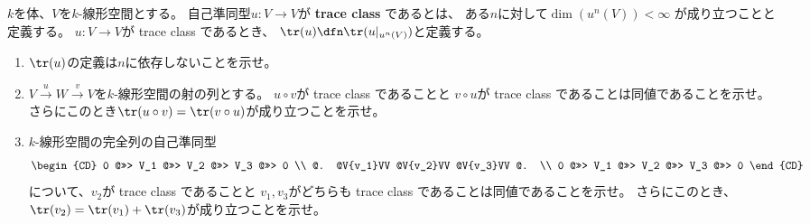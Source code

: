 \documentclass[uplatex,dvipdfmx]{jsarticle}
\begin{document}
\maketitle\HeaderCommentA
\section{}
\fi


\begin{prob}\label{1.33}
  \(k\)を体、\(V\)を\(k\)-線形空間とする。
  自己準同型\(u:V\to V\)が
  \textbf{trace class}
  であるとは、
  ある\(n\)に対して\(\dim(u^n(V)) < \infty\)
  が成り立つことと定義する。
  \(u:V\to V\)が trace class であるとき、
  \(\tr(u) \dfn \tr(u|_{u^n(V)})\)と定義する。
  \begin{enumerate}
    \item \label{1.33.1}
    \(\tr(u)\)の定義は\(n\)に依存しないことを示せ。
    \item \label{1.33.2}
    \(V\xrightarrow{u} W \xrightarrow{v} V\)を\(k\)-線形空間の射の列とする。
    \(u\circ v\)が trace class であることと
    \(v\circ u\)が trace class であることは同値であることを示せ。
    さらにこのとき\(\tr(u\circ v) = \tr(v\circ u)\)が成り立つことを示せ。
    \item \label{1.33.3}
    \(k\)-線形空間の完全列の自己準同型
    \[
    \begin{CD}
      0 @>>> V_1 @>>> V_2 @>>> V_3 @>>> 0 \\
      @. @V{v_1}VV @V{v_2}VV @V{v_3}VV @. \\
      0 @>>> V_1 @>>> V_2 @>>> V_3 @>>> 0
    \end{CD}
    \]
    について、\(v_2\)が trace class であることと
    \(v_1,v_3\)がどちらも trace class であることは同値であることを示せ。
    さらにこのとき、\(\tr(v_2) = \tr(v_1) + \tr(v_3)\)が成り立つことを示せ。
  \end{enumerate}
\end{prob}
\end{document}
